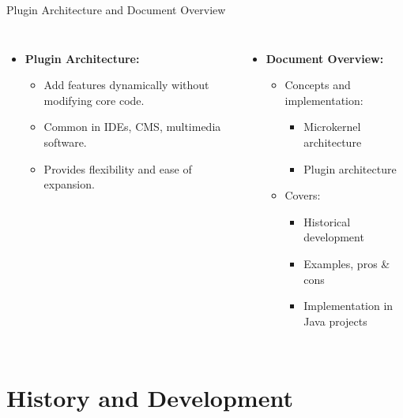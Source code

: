 \documentclass[aspectratio=169, table]{beamer}
\begin{document}
\begin{frame}{Plugin Architecture and Document Overview}
\begin{columns}
\begin{itemize}
	\item \textbf{Plugin Architecture:}
	\begin{itemize}
		\item Add features dynamically without modifying core code.
		\item Common in IDEs, CMS, multimedia software.
		\item Provides flexibility and ease of expansion.
	\end{itemize}
\end{itemize}

\begin{itemize}
	\item \textbf{Document Overview:}
	\begin{itemize}
		\item Concepts and implementation:
		\begin{itemize}
			\item Microkernel architecture
			\item Plugin architecture
		\end{itemize}
		\item Covers:
		\begin{itemize}
			\item Historical development
			\item Examples, pros \& cons
			\item Implementation in Java projects
		\end{itemize}
	\end{itemize}
\end{itemize}
\end{columns}
\end{frame}

\section{History and Development}
\end{document}
